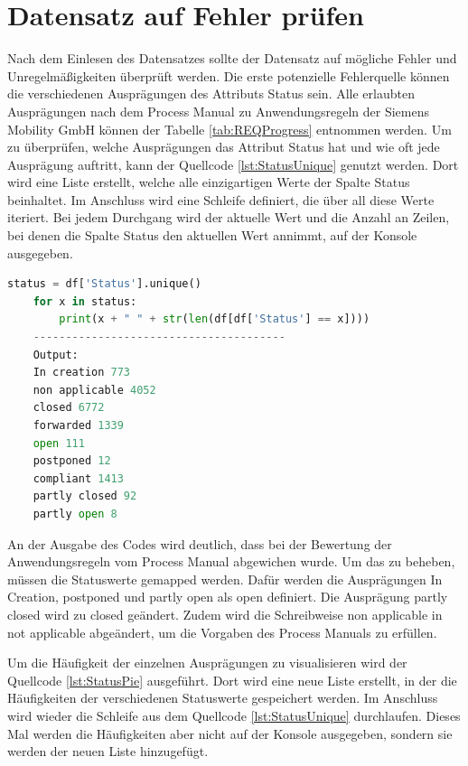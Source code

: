 \section{Datensatz auf Fehler prüfen}
Nach dem Einlesen des Datensatzes sollte der Datensatz auf mögliche Fehler und Unregelmäßigkeiten überprüft werden. 
Die erste potenzielle Fehlerquelle können die verschiedenen Ausprägungen des Attributs Status sein. Alle erlaubten Ausprägungen nach dem 
Process Manual zu Anwendungsregeln der Siemens Mobility GmbH können der Tabelle \ref*{tab:REQProgress} entnommen werden. Um zu überprüfen, welche Ausprägungen
das Attribut Status hat und wie oft jede Ausprägung auftritt, kann der Quellcode \ref*{lst:StatusUnique} genutzt werden. Dort wird eine Liste erstellt,
welche alle einzigartigen Werte der Spalte Status beinhaltet. Im Anschluss wird eine Schleife definiert, die über all diese Werte iteriert.
Bei jedem Durchgang wird der aktuelle Wert und die Anzahl an Zeilen, bei denen die Spalte Status den aktuellen Wert annimmt, auf der Konsole ausgegeben.

\begin{lstlisting}[language = python, caption={Häufigkeit der Ausprägungen von Status bestimmen},captionpos=b, label = lst:StatusUnique, floatplacement=H]
    status = df['Status'].unique()
    for x in status:
        print(x + " " + str(len(df[df['Status'] == x])))
    ---------------------------------------
    Output:
    In creation 773
    non applicable 4052
    closed 6772
    forwarded 1339
    open 111
    postponed 12
    compliant 1413
    partly closed 92
    partly open 8
\end{lstlisting}

An der Ausgabe des Codes wird deutlich, dass bei der Bewertung der Anwendungsregeln vom Process Manual abgewichen wurde. Um das zu beheben, müssen die Statuswerte gemapped werden.
Dafür werden die Ausprägungen \glqq In Creation\grqq{}, \glqq postponed\grqq{} und \glqq partly open\grqq{} als \glqq open\grqq{} definiert.
Die Ausprägung \glqq partly closed\grqq{} wird zu \glqq closed\grqq{} geändert. Zudem wird die Schreibweise \glqq non applicable\grqq{} in \glqq not applicable\grqq{} abgeändert,
um die Vorgaben des Process Manuals zu erfüllen. 

Um die Häufigkeit der einzelnen Ausprägungen zu visualisieren wird der Quellcode \ref*{lst:StatusPie} ausgeführt.
Dort wird eine neue Liste erstellt, in der die Häufigkeiten der verschiedenen Statuswerte gespeichert werden.
Im Anschluss wird wieder die Schleife aus dem Quellcode \ref*{lst:StatusUnique} durchlaufen. Dieses Mal werden die Häufigkeiten aber nicht auf der Konsole ausgegeben,
sondern sie werden der neuen Liste hinzugefügt.

